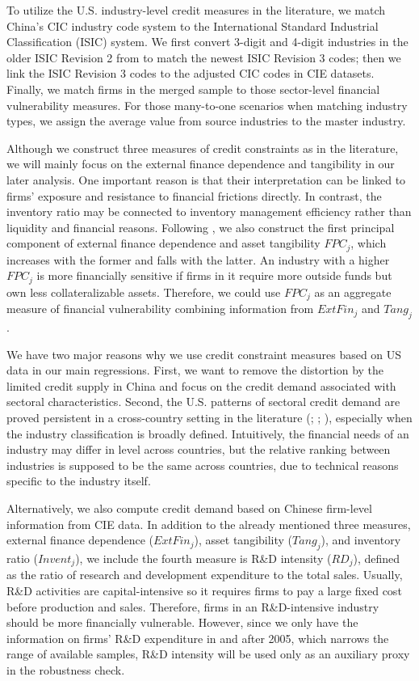 \documentclass[12pt]{article}
\begin{document}
To utilize the U.S. industry-level credit measures in the literature, we match China's CIC industry code system to the International Standard Industrial Classification (ISIC) system. We first convert 3-digit and 4-digit industries in the older ISIC Revision 2 from \cite{manova-wei-zhang2015} to match the newest ISIC Revision 3 codes; then we link the ISIC Revision 3 codes to the adjusted CIC codes in CIE datasets. Finally, we match firms in the merged sample to those sector-level financial vulnerability measures. For those many-to-one scenarios when matching industry types, we assign the average value from source industries to the master industry.

Although we construct three measures of credit constraints as in the literature, we will mainly focus on the external finance dependence and tangibility in our later analysis. One important reason is that their interpretation can be linked to firms' exposure and resistance to financial frictions directly. In contrast, the inventory ratio may be connected to inventory management efficiency rather than liquidity and financial reasons. Following \cite{manova-wei-zhang2015}, we also construct the first principal component of external finance dependence and asset tangibility $FPC_j$, which increases with the former and falls with the latter. An industry with a higher $FPC_j$ is more financially sensitive if firms in it require more outside funds but own less collateralizable assets. Therefore, we could use $FPC_j$ as an aggregate measure of financial vulnerability combining information from $ExtFin_j$ and $Tang_j$.

We have two major reasons why we use credit constraint measures based on US data in our main regressions. First, we want to remove the distortion by the limited credit supply in China and focus on the credit demand associated with sectoral characteristics. Second, the U.S. patterns of sectoral credit demand are proved persistent in a cross-country setting in the literature (\cite{kroszner2007}; \cite{manova-wei-zhang2015}; \cite{fan-lai-li2015}), especially when the industry classification is broadly defined. Intuitively, the financial needs of an industry may differ in level across countries, but the relative ranking between industries is supposed to be the same across countries, due to technical reasons specific to the industry itself.

Alternatively, we also compute credit demand based on Chinese firm-level information from CIE data. In addition to the already mentioned three measures, external finance dependence ($ExtFin_j$), asset tangibility ($Tang_j$), and inventory ratio ($Invent_j$), we include the fourth measure is R\&D intensity ($RD_j$), defined as the ratio of research and development expenditure to the total sales. Usually, R\&D activities are capital-intensive so it requires firms to pay a large fixed cost before production and sales. Therefore, firms in an R\&D-intensive industry should be more financially vulnerable. However, since we only have the information on firms' R\&D expenditure in and after 2005, which narrows the range of available samples, R\&D intensity will be used only as an auxiliary proxy in the robustness check. 
\end{document}
